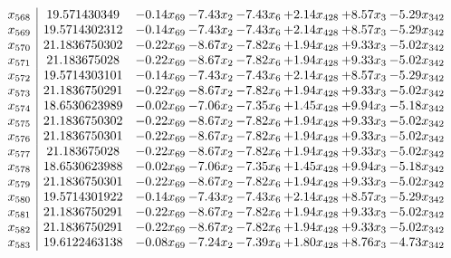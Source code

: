 \documentclass[8pt]{article}
\begin{document}
\[\begin{array}{c| c c@{\hskip 2pt} c@{\hskip 2pt} c@{\hskip 2pt} c@{\hskip 2pt} c@{\hskip 2pt} c@{\hskip 2pt} }
 x_{568}   &  19.571430349 & -0.14 x_{69} & -7.43 x_{2} & -7.43 x_{6} & +  2.14 x_{428} & +  8.57 x_{3} & -5.29 x_{342}\\
 x_{569}   &  19.5714302312 & -0.14 x_{69} & -7.43 x_{2} & -7.43 x_{6} & +  2.14 x_{428} & +  8.57 x_{3} & -5.29 x_{342}\\
 x_{570}   &  21.1836750302 & -0.22 x_{69} & -8.67 x_{2} & -7.82 x_{6} & +  1.94 x_{428} & +  9.33 x_{3} & -5.02 x_{342}\\
 x_{571}   &  21.183675028 & -0.22 x_{69} & -8.67 x_{2} & -7.82 x_{6} & +  1.94 x_{428} & +  9.33 x_{3} & -5.02 x_{342}\\
 x_{572}   &  19.5714303101 & -0.14 x_{69} & -7.43 x_{2} & -7.43 x_{6} & +  2.14 x_{428} & +  8.57 x_{3} & -5.29 x_{342}\\
 x_{573}   &  21.1836750291 & -0.22 x_{69} & -8.67 x_{2} & -7.82 x_{6} & +  1.94 x_{428} & +  9.33 x_{3} & -5.02 x_{342}\\
 x_{574}   &  18.6530623989 & -0.02 x_{69} & -7.06 x_{2} & -7.35 x_{6} & +  1.45 x_{428} & +  9.94 x_{3} & -5.18 x_{342}\\
 x_{575}   &  21.1836750302 & -0.22 x_{69} & -8.67 x_{2} & -7.82 x_{6} & +  1.94 x_{428} & +  9.33 x_{3} & -5.02 x_{342}\\
 x_{576}   &  21.1836750301 & -0.22 x_{69} & -8.67 x_{2} & -7.82 x_{6} & +  1.94 x_{428} & +  9.33 x_{3} & -5.02 x_{342}\\
 x_{577}   &  21.183675028 & -0.22 x_{69} & -8.67 x_{2} & -7.82 x_{6} & +  1.94 x_{428} & +  9.33 x_{3} & -5.02 x_{342}\\
 x_{578}   &  18.6530623988 & -0.02 x_{69} & -7.06 x_{2} & -7.35 x_{6} & +  1.45 x_{428} & +  9.94 x_{3} & -5.18 x_{342}\\
 x_{579}   &  21.1836750301 & -0.22 x_{69} & -8.67 x_{2} & -7.82 x_{6} & +  1.94 x_{428} & +  9.33 x_{3} & -5.02 x_{342}\\
 x_{580}   &  19.5714301922 & -0.14 x_{69} & -7.43 x_{2} & -7.43 x_{6} & +  2.14 x_{428} & +  8.57 x_{3} & -5.29 x_{342}\\
 x_{581}   &  21.1836750291 & -0.22 x_{69} & -8.67 x_{2} & -7.82 x_{6} & +  1.94 x_{428} & +  9.33 x_{3} & -5.02 x_{342}\\
 x_{582}   &  21.1836750291 & -0.22 x_{69} & -8.67 x_{2} & -7.82 x_{6} & +  1.94 x_{428} & +  9.33 x_{3} & -5.02 x_{342}\\
 x_{583}   &  19.6122463138 & -0.08 x_{69} & -7.24 x_{2} & -7.39 x_{6} & +  1.80 x_{428} & +  8.76 x_{3} & -4.73 x_{342}\\

\end{array}\]
\end{document}
